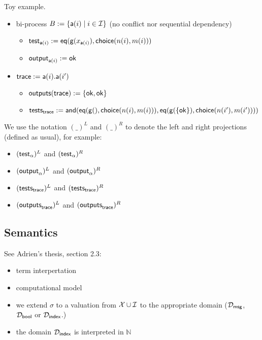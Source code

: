\begin{example}
  Toy example.
  \begin{itemize}
    \item bi-process $B := \{ \textsf{a}(i) \mid i \in \mathcal{I} \}$ (no conflict nor sequential dependency)
      \begin{itemize}
        \item $\textsf{test}_{\textsf{a}(i)} := \mathsf{eq}(\mathsf{g}(x_{\textsf{a}(i)}), \mathsf{choice}(n(i),m(i)))$
        \item $\textsf{output}_{\textsf{a}(i)} := \mathsf{ok}$
      \end{itemize}
    \item $\textsf{trace} := \textsf{a}(i).\textsf{a}(i')$
    \begin{itemize}
      \item $\textsf{outputs}(\textsf{trace}) := \{\mathsf{ok},\mathsf{ok}\}$
      \item $\textsf{tests}_{\textsf{trace}} := \mathsf{and}(\mathsf{eq}(\mathsf{g}(), \mathsf{choice}(n(i),m(i))), \mathsf{eq}(\mathsf{g}(\{\mathsf{ok}\}), \mathsf{choice}(n(i'),m(i'))))$
    \end{itemize}
  \end{itemize}
\end{example}

\bigskip
\noindent
We use the notation $(\_)^L$ and $(\_)^R$ to denote the left and right projections (defined as usual), for example:
\begin{itemize}
  \item $(\textsf{test}_{\alpha})^L$ and $(\textsf{test}_{\alpha})^R$
  \item $(\textsf{output}_{\alpha})^L$ and $(\textsf{output}_{\alpha})^R$
  \item $(\textsf{tests}_{\textsf{trace}})^L$ and $(\textsf{tests}_{\textsf{trace}})^R$
  \item $(\textsf{outputs}_{\textsf{trace}})^L$ and $(\textsf{outputs}_{\textsf{trace}})^R$
\end{itemize}

\subsection{Semantics}

See Adrien's thesis, section 2.3:
\begin{itemize}
  \item term interpertation
  \item computational model
  \item we extend $\sigma$ to a valuation from $\mathcal{X} \cup \mathcal{I}$ to the appropriate domain ($\mathcal{D}_{\textsf{msg}}$, $\mathcal{D}_{\textsf{bool}}$ or $\mathcal{D}_{\textsf{index}}$.)
  \item the domain $\mathcal{D}_{\textsf{index}}$ is interpreted in $\mathbb{N}$
\end{itemize}

